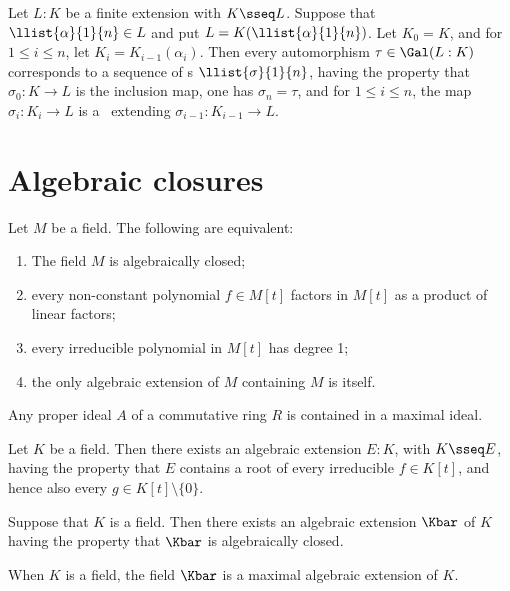 \documentclass{article}
\begin{document}
  \begin{corollary}
    Let $L:K$ be a finite extension with $K\sseq L$. Suppose that $\llist{\alpha}{1}{n}\in L$ and put $L=K(\llist{\alpha}{1}{n})$. Let $K_0=K$, and for $1\leq i\leq n$, let $K_i=K_{i-1}(\alpha_i)$. Then every automorphism $\tau\in\Gal(L:K)$ corresponds to a sequence of \homo s $\llist{\sigma}{1}{n}$, having the property that $\sigma_0:K\to L$ is the inclusion map, one has $\sigma_n=\tau$, and for $1\leq i\leq n$, the map $\sigma_i:K_i\to L$ is a \homo~extending $\sigma_{i-1}:K_{i-1}\to L$.
  \end{corollary}

\section{Algebraic closures}
  \begin{lemma}
    Let $M$ be a field. The following are equivalent:
    \begin{enumerate}[label=(\roman*)]
      \item The field $M$ is algebraically closed;
      \item every non-constant polynomial $f\in M[t]$ factors in $M[t]$ as a product of linear factors;
      \item every irreducible polynomial in $M[t]$ has degree 1;
      \item the only algebraic extension of $M$ containing $M$ is itself.
    \end{enumerate}
  \end{lemma}

  \begin{proposition}
    Any proper ideal $A$ of a commutative ring $R$ is contained in a maximal ideal.
  \end{proposition}

  \begin{lemma}
    Let $K$ be a field. Then there exists an algebraic extension $E:K$, with $K\sseq E$, having the property that $E$ contains a root of every irreducible $f\in K[t]$, and hence also every $g\in K[t]\setminus\{ 0 \}$.
  \end{lemma}

  \begin{theorem}
    Suppose that $K$ is a field. Then there exists an algebraic extension $\Kbar$ of $K$ having the property that $\Kbar$ is algebraically closed.
  \end{theorem}

  \begin{corollary}
    When $K$ is a field, the field $\Kbar$ is a maximal algebraic extension of $K$.
  \end{corollary}
\end{document}
